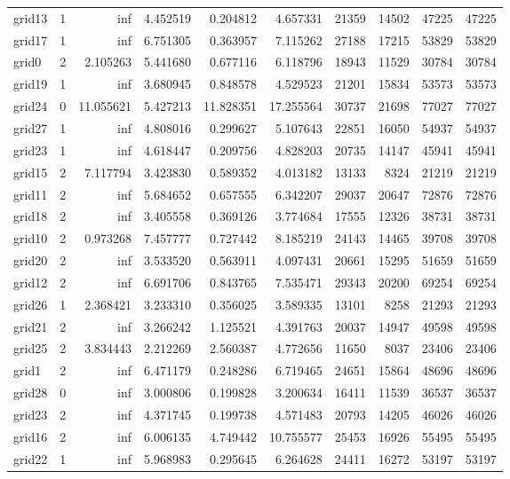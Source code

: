 \begin{longtable}{|l|r|r|r|r|r|r|r|r|r|}
grid13 & 1 & inf & 4.452519 & 0.204812 & 4.657331 & 21359 & 14502 & 47225 & 47225 \\
grid17 & 1 & inf & 6.751305 & 0.363957 & 7.115262 & 27188 & 17215 & 53829 & 53829 \\
grid0 & 2 & 2.105263 & 5.441680 & 0.677116 & 6.118796 & 18943 & 11529 & 30784 & 30784 \\
grid19 & 1 & inf & 3.680945 & 0.848578 & 4.529523 & 21201 & 15834 & 53573 & 53573 \\
grid24 & 0 & 11.055621 & 5.427213 & 11.828351 & 17.255564 & 30737 & 21698 & 77027 & 77027 \\
grid27 & 1 & inf & 4.808016 & 0.299627 & 5.107643 & 22851 & 16050 & 54937 & 54937 \\
grid23 & 1 & inf & 4.618447 & 0.209756 & 4.828203 & 20735 & 14147 & 45941 & 45941 \\
grid15 & 2 & 7.117794 & 3.423830 & 0.589352 & 4.013182 & 13133 & 8324 & 21219 & 21219 \\
grid11 & 2 & inf & 5.684652 & 0.657555 & 6.342207 & 29037 & 20647 & 72876 & 72876 \\
grid18 & 2 & inf & 3.405558 & 0.369126 & 3.774684 & 17555 & 12326 & 38731 & 38731 \\
grid10 & 2 & 0.973268 & 7.457777 & 0.727442 & 8.185219 & 24143 & 14465 & 39708 & 39708 \\
grid20 & 2 & inf & 3.533520 & 0.563911 & 4.097431 & 20661 & 15295 & 51659 & 51659 \\
grid12 & 2 & inf & 6.691706 & 0.843765 & 7.535471 & 29343 & 20200 & 69254 & 69254 \\
grid26 & 1 & 2.368421 & 3.233310 & 0.356025 & 3.589335 & 13101 & 8258 & 21293 & 21293 \\
grid21 & 2 & inf & 3.266242 & 1.125521 & 4.391763 & 20037 & 14947 & 49598 & 49598 \\
grid25 & 2 & 3.834443 & 2.212269 & 2.560387 & 4.772656 & 11650 & 8037 & 23406 & 23406 \\
grid1 & 2 & inf & 6.471179 & 0.248286 & 6.719465 & 24651 & 15864 & 48696 & 48696 \\
grid28 & 0 & inf & 3.000806 & 0.199828 & 3.200634 & 16411 & 11539 & 36537 & 36537 \\
grid23 & 2 & inf & 4.371745 & 0.199738 & 4.571483 & 20793 & 14205 & 46026 & 46026 \\
grid16 & 2 & inf & 6.006135 & 4.749442 & 10.755577 & 25453 & 16926 & 55495 & 55495 \\
grid22 & 1 & inf & 5.968983 & 0.295645 & 6.264628 & 24411 & 16272 & 53197 & 53197 \\

\end{longtable}
